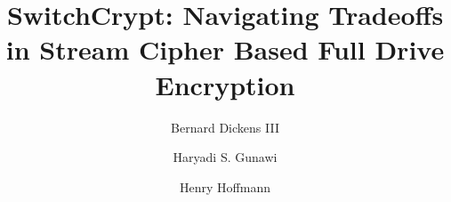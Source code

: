 \documentclass[sigplan,10pt,review,anonymous]{acmart}\settopmatter{printfolios=true,printccs=false,printacmref=false}
\begin{document}
\title{SwitchCrypt: Navigating Tradeoffs in Stream Cipher Based Full Drive Encryption}




\author{Bernard Dickens III}

\author{Haryadi S. Gunawi}


\author{Henry Hoffmann}
\end{document}
